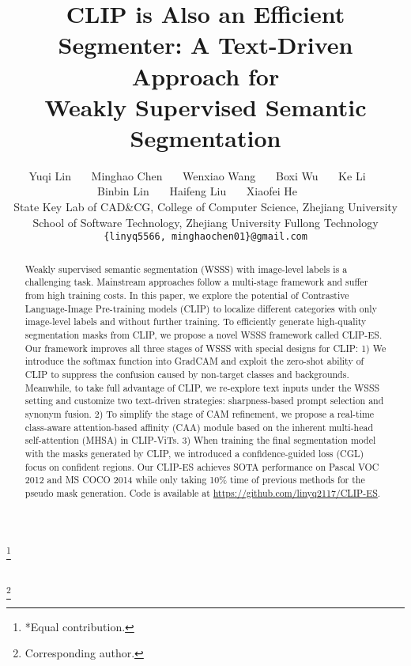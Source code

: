 \documentclass[10pt,twocolumn,letterpaper]{article}
\newcommand\blfootnote[1]{\begingroup
\renewcommand\thefootnote{}\footnote{#1}\addtocounter{footnote}{-1}\endgroup
}
\begin{document}
\title{
CLIP is Also an Efficient Segmenter: A Text-Driven Approach for \\ 
Weakly Supervised Semantic Segmentation}


\author{
Yuqi Lin~~~
Minghao Chen~~~
Wenxiao Wang~~~
Boxi Wu~~~
Ke Li~~~ \\
Binbin Lin~~~
Haifeng Liu~~~
Xiaofei He~~~
\smallskip 
\\
State Key Lab of CAD\&CG, College of Computer Science, Zhejiang University
\\
School of Software Technology, Zhejiang University    Fullong Technology
\\
\tt\small \{linyq5566, minghaochen01\}@gmail.com}
\maketitle
\blfootnote{*Equal contribution.} \\
\blfootnote{Corresponding author.}

\begin{abstract}
\vspace{-1mm}
   Weakly supervised semantic segmentation (WSSS) with image-level labels is a challenging task. Mainstream approaches follow a multi-stage framework and suffer from high training costs. In this paper, we explore the potential of Contrastive Language-Image Pre-training models (CLIP) to localize different categories with only image-level labels and without further training.
   To efficiently generate high-quality segmentation masks from CLIP, we propose a novel WSSS framework called CLIP-ES. Our framework improves all three stages of WSSS with special designs for CLIP: 1) We introduce the softmax function into GradCAM and exploit the zero-shot ability of CLIP to suppress the confusion caused by non-target classes and backgrounds. Meanwhile, to take full advantage of CLIP, we re-explore text inputs under the WSSS setting and customize two text-driven strategies: sharpness-based prompt selection and synonym fusion. 2) To simplify the stage of CAM refinement, we propose a real-time class-aware attention-based affinity (CAA) module based on the inherent multi-head self-attention (MHSA) in CLIP-ViTs. 3) When training the final segmentation model with the masks generated by CLIP, we introduced a confidence-guided loss (CGL) focus on confident regions. 
Our CLIP-ES achieves SOTA performance on Pascal VOC 2012 and MS COCO 2014 while only taking 10\% time of previous methods for the pseudo mask generation. Code is available at \href{https://github.com/linyq2117/CLIP-ES}{https://github.com/linyq2117/CLIP-ES}.
   
   
\end{abstract}
\end{document}
